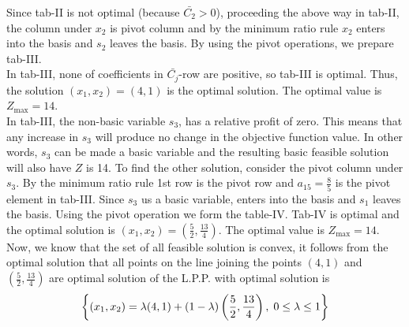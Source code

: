 \documentclass[../main-sheet.tex]{subfiles}
\begin{document}
\begin{soln}
    Since tab-II is not optimal (because \(\bar{C_2}>0\)), proceeding the above way in tab-II, the column under \(x_2\) is pivot column and by the minimum ratio rule \(x_2\) enters into the basis and \(s_2\) leaves the basis. By using the pivot operations, we prepare tab-III.\\

    In tab-III, none of coefficients in \(\bar{C_j}\)-row are positive, so tab-III is optimal. Thus, the solution \((x_1,x_2)=(4,1)\) is the optimal solution. The optimal value is \(Z_{\text{max}}=14\).\\

    In tab-III, the non-basic variable \(s_3\), has a relative profit of zero. This means that any increase in \(s_3\) will produce no change in the objective function value. In other words, \(s_3\) can be made a basic variable and the resulting basic feasible solution will also have \(Z\) is 14. To find the other solution, consider the pivot column under \(s_3\). By the minimum ratio rule 1st row is the pivot row and \(a_{15}=\frac{8}{5}\) is the pivot element in tab-III. Since \(s_3\) us a basic variable, enters into the basis and \(s_1\) leaves the basis. Using the pivot operation we form the table-IV. Tab-IV is optimal and the optimal solution is \((x_1,x_2)=\left( \frac{5}{2},\frac{13}{4} \right)\). The optimal value is \(Z_{\text{max}}=14\).\\

    Now, we know that the set of all feasible solution is convex, it follows from the optimal solution that all points on the line joining the points \((4,1)\) and \(\left( \frac{5}{2},\frac{13}{4} \right)\) are optimal solution of the L.P.P. with optimal solution is 
    \[\left\{(x_1,x_2)=\lambda (4,1)+(1-\lambda)\left( \frac{5}{2},\frac{13}{4} \right),\;0\leq \lambda \leq1\right\}\]
\end{soln}
\end{document}
